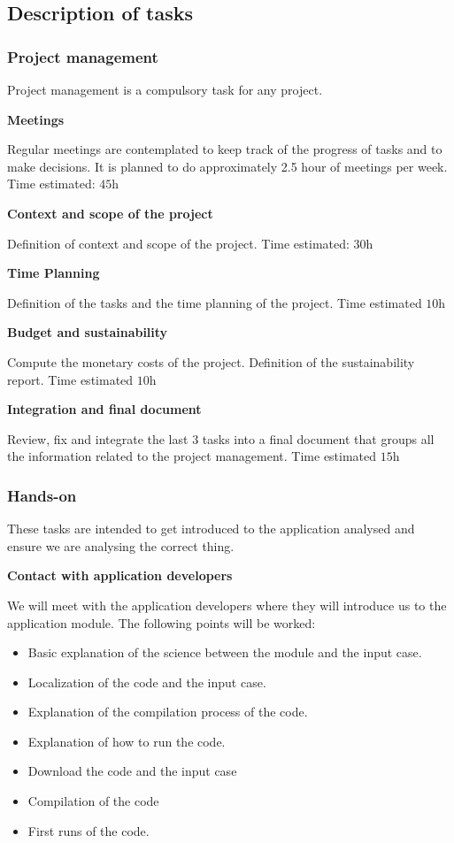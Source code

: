 \subsection{Description of tasks}

\subsubsection{Project management}

Project management is a compulsory task for any project. 

\textbf{Meetings}

Regular meetings are contemplated to keep track of the progress of tasks and to make decisions. It is planned to do approximately 2.5 hour of meetings per week. Time estimated: $\si{45\hour}$ 

\textbf{Context and scope of the project}

Definition of context and scope of the project. Time estimated: $\si{30\hour}$

\textbf{Time Planning}

Definition of the tasks and the time planning of the project. Time estimated $\si{10\hour}$

\textbf{Budget and sustainability}

Compute the monetary costs of the project. Definition of the sustainability report. Time estimated $\si{10\hour}$

\textbf{Integration and final document}

Review, fix and integrate the last 3 tasks into a final document that groups all the information related to the project management. Time estimated $\si{15\hour}$

\subsubsection{Hands-on}
These tasks are intended to get introduced to the application analysed and ensure we are analysing the correct thing.

\textbf{Contact with application developers}

We will meet with the application developers where they will introduce us to the application module. The following points will be worked:
\begin{itemize}
  \item Basic explanation of the science between the module and the input case.
  \item Localization of the code and the input case.
  \item Explanation of the compilation process of the code.
  \item Explanation of how to run the code.
  \item Download the code and the input case
  \item Compilation of the code
  \item First runs of the code.
\end{itemize}

